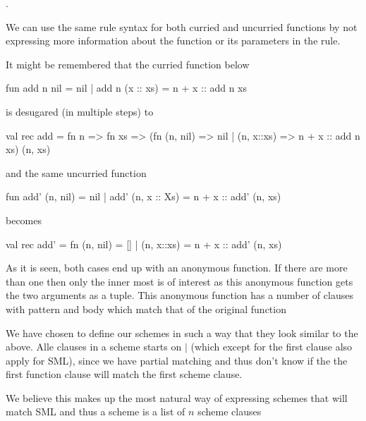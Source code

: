 
. 



We can use the same rule syntax for both curried and uncurried functions by not
expressing more information about the function or its parameters in the rule.

It might be remembered that the curried function below

\begin{code}
fun add n nil       = nil
  | add n (x :: xs) = n + x :: add n xs
\end{code}

is desugared (in multiple steps) to

\begin{code}
val rec add = fn n => 
              fn xs => (fn (n, nil) => nil
                         | (n, x::xs) => n + x :: add n xs) (n, xs)
\end{code} 

and the same uncurried function 

\begin{code}
fun add' (n, nil)     = nil
  | add' (n, x :: Xs) = n + x :: add' (n, xs)
\end{code}

becomes

\begin{code}
val rec add' = fn (n, nil) = []
                | (n, x::xs) = n + x :: add' (n, xs)
\end{code}

As it is seen, both cases end up with an anonymous function. If there are more
than one then only the inner most is of interest as this anonymous
function gets the two arguments as a tuple. This anonymous function has a number
of clauses with pattern and body which match that of the original function

We have chosen to define our schemes in such a way that they look similar to the
above. Alle clauses in a scheme starts on $|$ (which except for the first clause
also apply for SML), since we have partial matching and thus don't know if the
the first function clause will match the first scheme clause.

We believe this makes up the most natural way of expressing schemes that will
match SML and thus a scheme is a list of $n$ scheme clauses

